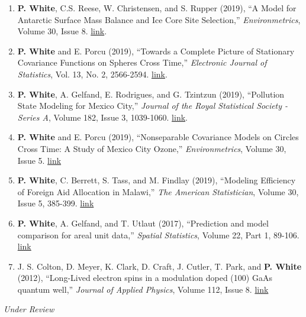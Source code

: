 \documentclass[11pt]{article}
\begin{document}
\begin{enumerate}[label=$\bullet$]
\item \textbf{P. White}, C.S. Reese, W. Christensen, and S. Rupper (2019), ``A Model for Antarctic Surface Mass Balance and Ice Core Site Selection,'' \emph{Environmetrics}, Volume 30, Issue 8. \href{https://onlinelibrary.wiley.com/doi/abs/10.1002/env.2579}{link}.
\item \textbf{P. White} and E. Porcu (2019), ``Towards a Complete Picture of Stationary Covariance Functions on Spheres Cross Time,'' \emph{Electronic Journal of Statistics}, Vol. 13, No. 2, 2566-2594. \href{https://doi.org/10.1214/19-EJS1593}{link}.
\item \textbf{P. White}, A. Gelfand, E. Rodrigues, and G. Tzintzun (2019), ``Pollution State Modeling for Mexico City,'' \emph{Journal of the Royal Statistical Society - Series A}, Volume 182, Issue 3, 1039-1060. \href{https://rss.onlinelibrary.wiley.com/doi/abs/10.1111/rssa.12444}{link}.
\item \textbf{P. White} and E. Porcu (2019), ``Nonseparable Covariance Models on Circles Cross Time: A Study of Mexico City Ozone,'' \emph{Environmetrics}, Volume 30, Issue 5. \href{https://onlinelibrary.wiley.com/doi/full/10.1002/env.2558}{link}
\item \textbf{P. White}, C. Berrett, S. Tass, and M. Findlay (2019), ``Modeling Efficiency of Foreign Aid Allocation in Malawi,'' \emph{The American Statistician}, Volume 30, Issue 5, 385-399.  \href{https://www.tandfonline.com/doi/full/10.1080/00031305.2018.1470032}{link}
\item \textbf{P. White}, A. Gelfand, and T. Utlaut (2017), ``Prediction and model comparison for areal unit data,'' \emph{Spatial Statistics}, Volume 22, Part 1, 89-106. \href{http://www.sciencedirect.com/science/article/pii/S2211675317301422}{link}
\item J. S. Colton, D. Meyer, K. Clark, D. Craft, J. Cutler, T. Park, and \textbf{P. White} (2012), ``Long-Lived electron spins in a modulation doped (100) GaAs quantum well,'' \emph{Journal of Applied Physics}, Volume 112, Issue 8.  \href{http://aip.scitation.org/doi/abs/10.1063/1.4759320}{link}
\end{enumerate}

\emph{Under Review}
\end{document}
